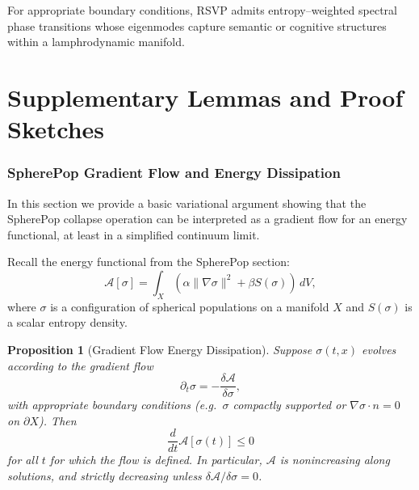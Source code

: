 \documentclass[12pt]{article}
\theoremstyle{plain}
\newtheorem{proposition}[theorem]{Proposition}
\theoremstyle{definition}
\theoremstyle{remark}
\begin{document}
\begin{conjecture}
For appropriate boundary conditions, RSVP admits entropy--weighted spectral
phase transitions whose eigenmodes capture semantic or cognitive structures
within a lamphrodynamic manifold.
\end{conjecture}


\part{Supplementary Lemmas and Proof Sketches}


\section{SpherePop Gradient Flow and Energy Dissipation}

In this section we provide a basic variational argument showing that the
SpherePop collapse operation can be interpreted as a gradient flow for an
energy functional, at least in a simplified continuum limit.

Recall the energy functional from the SpherePop section:
\begin{equation}
    \mathcal{A}[\sigma] 
    = \int_X \left( \alpha \|\nabla \sigma\|^2 + \beta S(\sigma)\right)\,dV,
    \label{eq:spherepop-energy}
\end{equation}
where $\sigma$ is a configuration of spherical populations on a manifold $X$
and $S(\sigma)$ is a scalar entropy density.

\begin{proposition}[Gradient Flow Energy Dissipation]
\label{prop:spherepop-energy-dissipation}
Suppose $\sigma(t,x)$ evolves according to the gradient flow
\begin{equation}
    \partial_t \sigma = - \frac{\delta \mathcal{A}}{\delta \sigma},
    \label{eq:spherepop-gradient-flow}
\end{equation}
with appropriate boundary conditions (e.g.\ $\sigma$ compactly supported or
$\nabla \sigma \cdot n = 0$ on $\partial X$). Then
\[
    \frac{d}{dt}\mathcal{A}[\sigma(t)] \le 0
\]
for all $t$ for which the flow is defined. In particular, $\mathcal{A}$ is
nonincreasing along solutions, and strictly decreasing unless
$\delta \mathcal{A}/\delta \sigma = 0$.
\end{proposition}
\end{document}
